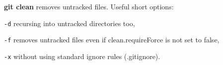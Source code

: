 %

\textbf{git clean} removes untracked files.
Useful short options:
\begin{compactenum}
\item [\texttt{-d}] recursing into untracked directories too,
\item [\texttt{-f}] removes untracked files even if clean.requireForce is not set to false,
\item [\texttt{-x}] without using standard ignore rules (.gitignore).
\end{compactenum}

%